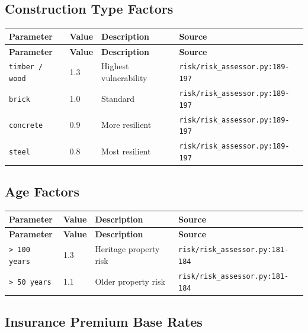 \documentclass[11pt,a4paper]{article}
\begin{document}
\subsection{Construction Type Factors}

\begin{longtable}{p{4cm}p{4cm}p{5.5cm}p{3.5cm}}
    \toprule
    \textbf{Parameter} & \textbf{Value} & \textbf{Description} & \textbf{Source} \\
    \midrule
    \endfirsthead
    \toprule
    \textbf{Parameter} & \textbf{Value} & \textbf{Description} & \textbf{Source} \\
    \midrule
    \endhead
    \bottomrule
    \endfoot
    \texttt{timber / wood} & 1.3 & Highest vulnerability & {\scriptsize \texttt{risk/risk\_assessor.py:189-197}} \\
    \texttt{brick} & 1.0 & Standard & {\scriptsize \texttt{risk/risk\_assessor.py:189-197}} \\
    \texttt{concrete} & 0.9 & More resilient & {\scriptsize \texttt{risk/risk\_assessor.py:189-197}} \\
    \texttt{steel} & 0.8 & Most resilient & {\scriptsize \texttt{risk/risk\_assessor.py:189-197}} \\
\end{longtable}

\subsection{Age Factors}

\begin{longtable}{p{4cm}p{4cm}p{5.5cm}p{3.5cm}}
    \toprule
    \textbf{Parameter} & \textbf{Value} & \textbf{Description} & \textbf{Source} \\
    \midrule
    \endfirsthead
    \toprule
    \textbf{Parameter} & \textbf{Value} & \textbf{Description} & \textbf{Source} \\
    \midrule
    \endhead
    \bottomrule
    \endfoot
    \texttt{> 100 years} & 1.3 & Heritage property risk & {\scriptsize \texttt{risk/risk\_assessor.py:181-184}} \\
    \texttt{> 50 years} & 1.1 & Older property risk & {\scriptsize \texttt{risk/risk\_assessor.py:181-184}} \\
\end{longtable}

\subsection{Insurance Premium Base Rates}
\end{document}
